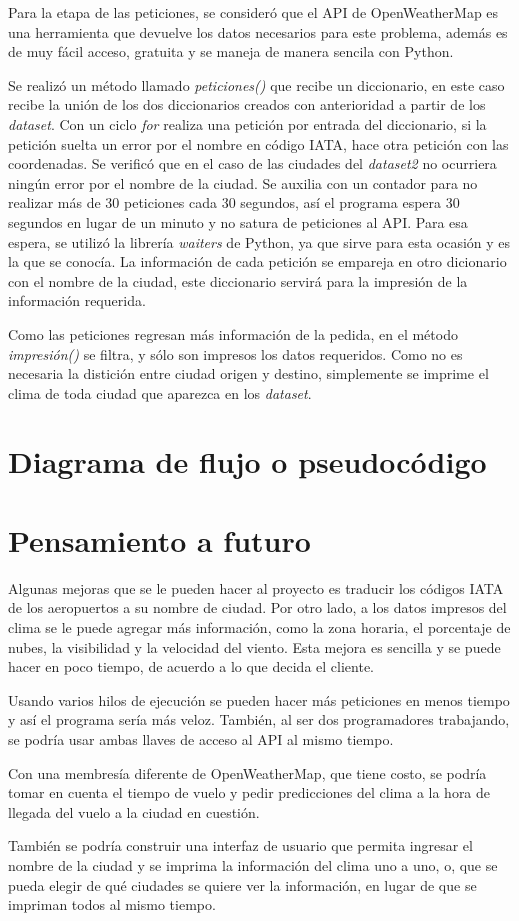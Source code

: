 \documentclass[]{article}
\begin{document}
Para la etapa de las peticiones, se consideró que el API de OpenWeatherMap 
es una herramienta que devuelve los datos necesarios para este problema, 
además es de muy fácil acceso, gratuita y se maneja de manera sencila con 
Python.

Se realizó un método llamado \emph{peticiones()} que recibe un diccionario, 
en este caso recibe la unión de los dos diccionarios creados con anterioridad 
a partir de los \emph{dataset}. Con un ciclo \emph{for} realiza una petición 
por entrada del diccionario, si la petición suelta un error por el nombre en 
código IATA, hace otra petición con las coordenadas. Se verificó que en el 
caso de las ciudades del  \emph{dataset2} no ocurriera ningún error por el 
nombre de la ciudad. Se auxilia con un contador para no realizar más de 30 
peticiones cada 30 segundos, así el programa espera 30 segundos en lugar 
de un minuto y no satura de peticiones al API. Para esa espera, se utilizó la 
librería \emph{waiters} de Python, ya que sirve para esta ocasión y es la que 
se conocía. La información de cada petición se empareja en otro dicionario 
con el nombre de la ciudad, este diccionario servirá para la impresión de la 
información requerida.

Como las peticiones regresan más información de la pedida, en el método
\emph{impresión()} se filtra, y sólo son impresos los datos requeridos. Como 
no es necesaria la distición entre ciudad origen y destino, simplemente se 
imprime el clima de toda ciudad que aparezca en los \emph{dataset}.

\section{Diagrama de flujo o pseudocódigo}


\section{Pensamiento a futuro}

Algunas mejoras que se le pueden hacer al proyecto es traducir los códigos 
IATA de los aeropuertos a su nombre de ciudad. Por otro lado, a los datos 
impresos del clima se le puede agregar más información, como la zona 
horaria, el porcentaje de nubes, la visibilidad y la velocidad del viento. Esta 
mejora es sencilla y se puede hacer en poco tiempo, de acuerdo a lo que 
decida el cliente.

Usando varios hilos de ejecución se pueden hacer más peticiones en menos 
tiempo y así el programa sería más veloz. También, al ser dos 
programadores trabajando, se podría usar ambas llaves de acceso al API al 
mismo tiempo.

Con una membresía diferente de OpenWeatherMap, que tiene costo, se 
podría tomar en cuenta el tiempo de vuelo y pedir predicciones del clima a la 
hora de llegada del vuelo a la ciudad en cuestión.

También se podría construir una interfaz de usuario que permita ingresar 
el nombre de la ciudad y se imprima la información del clima uno a uno, o, 
que se pueda elegir de qué ciudades se quiere ver la información, en lugar de 
que se impriman todos al mismo tiempo.
\end{document}
